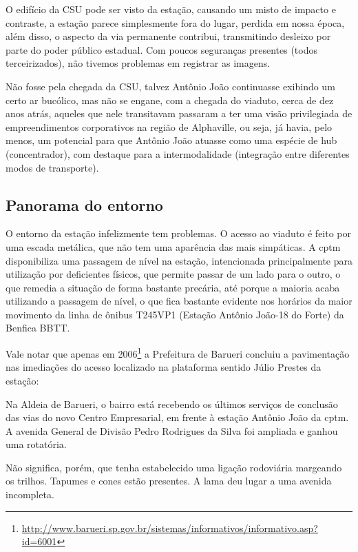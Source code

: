 \documentclass[11pt,fleqn]{book} %
\begin{document}
O edifício da CSU pode ser visto da estação, causando um misto de impacto e contraste, a estação parece simplesmente fora do lugar, perdida em nossa época, além disso, o aspecto da via permanente contribui, transmitindo desleixo por parte do poder público estadual. Com poucos seguranças presentes (todos terceirizados), não tivemos problemas em registrar as imagens.

Não fosse pela chegada da CSU, talvez Antônio João continuasse exibindo um certo ar bucólico, mas não se engane, com a chegada do viaduto, cerca de dez anos atrás, aqueles que nele transitavam passaram a ter uma visão privilegiada de empreendimentos corporativos na região de Alphaville, ou seja, já havia, pelo menos, um potencial para que Antônio João atuasse como uma espécie de hub (concentrador), com destaque para a intermodalidade (integração entre diferentes modos de transporte).

\subsection{Panorama do entorno}

O entorno da estação infelizmente tem problemas. O acesso ao viaduto é feito por uma escada metálica, que não tem uma aparência das mais simpáticas. A \gls{cptm} disponibiliza uma passagem de nível na estação, intencionada principalmente para utilização por deficientes físicos, que permite passar de um lado para o outro, o que remedia a situação de forma bastante precária, até porque a maioria acaba utilizando a passagem de nível, o que fica bastante evidente nos horários da maior movimento da linha de ônibus T245VP1 (Estação Antônio João-18 do Forte) da Benfica BBTT.

Vale notar que apenas em 2006\footnote{\url{http://www.barueri.sp.gov.br/sistemas/informativos/informativo.asp?id=6001}} a Prefeitura de Barueri concluiu a pavimentação nas imediações do acesso localizado na plataforma sentido Júlio Prestes da estação:

\begin{citacao}
	Na Aldeia de Barueri, o bairro está recebendo os últimos serviços de conclusão das vias do novo Centro Empresarial, em frente à estação Antônio João da \gls{cptm}. A avenida General de Divisão Pedro Rodrigues da Silva foi ampliada e ganhou uma rotatória.
\end{citacao}

Não significa, porém, que tenha estabelecido uma ligação rodoviária margeando os trilhos. Tapumes e cones estão presentes. A lama deu lugar a uma avenida incompleta.
\end{document}
